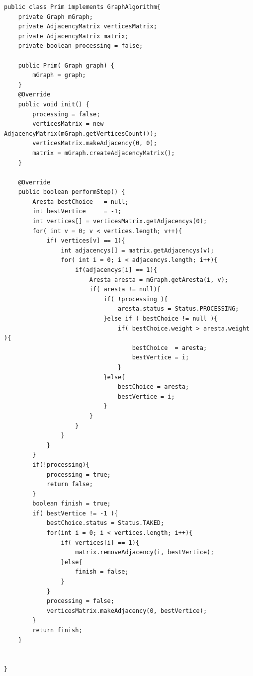 \documentclass[a4paper,12pt]{article}
\begin{document}
\begin{lstlisting}[title=Implementação do Algoritmo de Prims em Java]
public class Prim implements GraphAlgorithm{
	private Graph mGraph;
	private AdjacencyMatrix verticesMatrix;
	private AdjacencyMatrix matrix;
	private boolean processing = false;

	public Prim( Graph graph) {
		mGraph = graph;
	}
	@Override
	public void init() {
		processing = false;
		verticesMatrix = new AdjacencyMatrix(mGraph.getVerticesCount());
		verticesMatrix.makeAdjacency(0, 0);
		matrix = mGraph.createAdjacencyMatrix();
	}

	@Override
	public boolean performStep() {
		Aresta bestChoice 	= null;
		int bestVertice 	= -1;
		int vertices[] = verticesMatrix.getAdjacencys(0);
		for( int v = 0; v < vertices.length; v++){
			if( vertices[v] == 1){
				int adjacencys[] = matrix.getAdjacencys(v);
				for( int i = 0; i < adjacencys.length; i++){
					if(adjacencys[i] == 1){
						Aresta aresta = mGraph.getAresta(i, v);
						if( aresta != null){
							if( !processing ){
								aresta.status = Status.PROCESSING;
							}else if ( bestChoice != null ){
								if( bestChoice.weight > aresta.weight ){
									bestChoice  = aresta;
									bestVertice = i;
								}
							}else{
								bestChoice = aresta;
								bestVertice = i;
							}
						}
					}
				}
			}
		}
		if(!processing){
			processing = true;
			return false;
		}
		boolean finish = true;
		if( bestVertice != -1 ){
			bestChoice.status = Status.TAKED;			
			for(int i = 0; i < vertices.length; i++){
				if( vertices[i] == 1){
					matrix.removeAdjacency(i, bestVertice);
				}else{
					finish = false;
				}
			}			
			processing = false;
			verticesMatrix.makeAdjacency(0, bestVertice);
		}
		return finish;
	}


}
\end{lstlisting}
\end{document}
